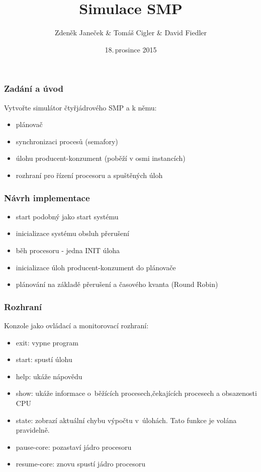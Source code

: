 \documentclass{beamer}
\title{Simulace SMP}
\author{Zdeněk Janeček \& Tomáš Cigler \& David Fiedler}
\date{18.\,prosince 2015}
\begin{document}
\begin{frame} 
\titlepage
\end{frame}

\begin{frame} 
\frametitle{Zadání a úvod}
Vytvořte simulátor čtyřjádrového SMP a k němu:

\begin{itemize}
\item plánovač
\item synchronizaci procesů (semafory)
\item úlohu producent-konzument (poběží v osmi instancích)
\item rozhraní pro řízení procesoru a spuštěných úloh
\end{itemize}

\end{frame}


\begin{frame} 
\frametitle{Návrh implementace}

\begin{itemize}
\item start podobný jako start systému
\item inicializace systému obsluh přerušení
\item běh procesoru - jedna INIT úloha
\item inicializace úloh producent-konzument do plánovače
\item plánování na základě přerušení a časového kvanta (Round Robin)
\end{itemize}

\end{frame}

\begin{frame} 
\frametitle{Rozhraní}

Konzole jako ovládací a monitorovací rozhraní:

\begin{itemize}
\item exit: vypne program
\item start: spustí úlohu
\item help: ukáže nápovědu
\item show: ukáže informace o~běžících procesech,čekajících procesech a obsazenosti CPU
\item state: zobrazí aktuální chybu výpočtu v~úlohách. Tato funkce je volána pravidelně.
\item pause-core: pozastaví jádro procesoru
\item resume-core: znovu spustí jádro procesoru
\end{itemize}

\end{frame}
\end{document}
